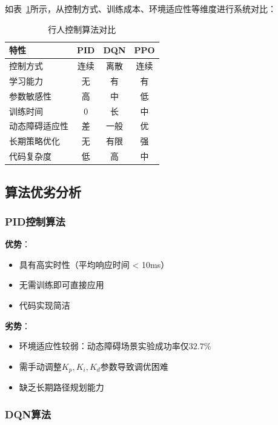 如表~\ref{tab:algorithm_comparison}所示，从控制方式、训练成本、环境适应性等维度进行系统对比：

\begin{table}[H]
  \centering
  \caption{行人控制算法对比}
  \label{tab:algorithm_comparison}
  \begin{tabular}{lccc}
    \toprule
    \textbf{特性} & \textbf{PID} & \textbf{DQN} & \textbf{PPO} \\
    \midrule
    控制方式 & 连续 & 离散 & 连续 \\
    学习能力 & 无 & 有 & 有 \\
    参数敏感性 & 高 & 中 & 低 \\
    训练时间 & 0 & 长 & 中 \\
    动态障碍适应性 & 差 & 一般 & 优 \\
    长期策略优化 & 无 & 有限 & 强 \\
    代码复杂度 & 低 & 高 & 中 \\
    \bottomrule
  \end{tabular}
\end{table}

\subsection{算法优劣分析}

\subsubsection{PID控制算法}

\textbf{优势}：
\begin{itemize}
  \item 具有高实时性（平均响应时间 < 10ms）
  \item 无需训练即可直接应用
  \item 代码实现简洁
\end{itemize}

\textbf{劣势}：
\begin{itemize}
  \item 环境适应性较弱：动态障碍场景实验成功率仅$32.7\%$
  \item 需手动调整$K_p,K_i,K_d$参数导致调优困难
  \item 缺乏长期路径规划能力
\end{itemize}

\subsubsection{DQN算法}
\label{subsubsec:dqn_analysis}

